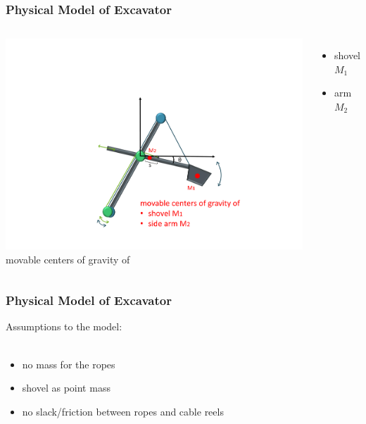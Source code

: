 \begin{frame}
	\frametitle{Physical Model of Excavator}
	
	
	\begin{columns}
			\centering
			\includegraphics[trim=25cm 5cm 35cm 23cm, clip=true, width=\linewidth]{img/Excavator_mass2}
			movable centers of gravity of
			\begin{itemize}
				\item{shovel $M_1$}
				\item{arm $M_2$}
			\end{itemize}
	\end{columns}
	
\end{frame}

\begin{frame}
	\frametitle{Physical Model of Excavator}
	
	
	Assumptions to the model:\\
	$ $ \\
	\begin{itemize}
		\item no mass for the ropes
		\item shovel as point mass %
		\item no slack/friction between ropes and cable reels
	\end{itemize}
	
\end{frame}

